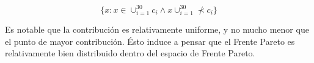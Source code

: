 \begin{equation}
\{x: x \in \cup_{i=1}^{30} c_i \wedge x \cup_{i=1}^{30} \not\prec c_i \}
\end{equation}

Es notable que la contribución es relativamente uniforme, y no mucho menor que el punto de mayor contribución. Ésto induce a pensar que el Frente Pareto es relativamente bien distribuido dentro del espacio de Frente Pareto.






